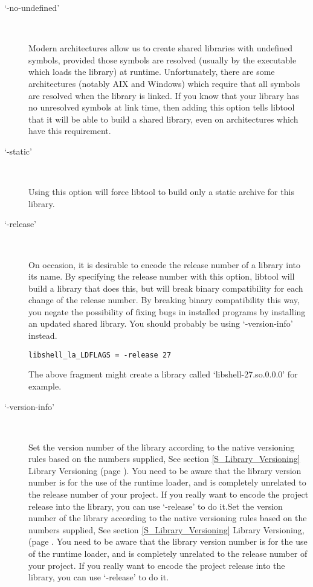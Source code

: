 \begin{description}
\item[`-no-undefined']
\ 

%
Modern architectures allow us to create shared libraries with undefined symbols, provided those symbols are resolved (usually by the executable which loads the library) at runtime. Unfortunately, there are some architectures (notably AIX and Windows) which require that all symbols are resolved when the library is linked. If you know that your library has no unresolved symbols at link time, then adding this option tells libtool that it will be able to build a shared library, even on architectures which have this requirement. 

\item[`-static']
\ 

%
Using this option will force libtool to build only a static archive for this 
library. 

\item[`-release']
\ 

%
On occasion, it is desirable to encode the release number of a library 
into its name. By specifying the release number with this option, libtool 
will build a library that does this, but will break binary compatibility 
for each change of the release number. By breaking binary compatibility this 
way, you negate the possibility of fixing bugs in installed programs by 
installing an updated shared library. You should probably be 
using `-version-info' instead.

\begin{Verbatim}[frame=single]
libshell_la_LDFLAGS = -release 27
\end{Verbatim}

The above fragment might create a library called `libshell-27.so.0.0.0' for example. 


\item[`-version-info']
\ 

%
Set the version number of the library according to the native versioning rules 
based on the numbers supplied, See section \ref{S_Library_Versioning} Library
Versioning (page \pageref{S_Library_Versioning}). You need to be aware that 
the library version number is for the use of the runtime loader, and is 
completely unrelated to the release number of your project. If you really want 
to encode the project release into the library, you can use `-release' to 
do it.Set the version number of the library according to the native versioning 
rules based on the numbers supplied, See section \ref{S_Library_Versioning}
Library Versioning, (page \pageref{S_Library_Versioning}. You need to be aware 
that the library version number is for the use of the runtime loader, and is 
completely unrelated to the release number of your project. If you really 
want to encode the project release into the library, you can use `-release' 
to do it.

\end{description}

